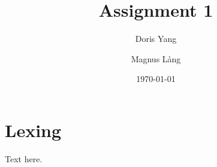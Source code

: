 \documentclass[a4paper,11pt]{article}
\title{Assignment 1}
\author{Doris Yang \and Magnus L{\aa}ng} %
\date{\today}
\begin{document}
\maketitle
\section{Lexing}
Text here.
\end{document}

